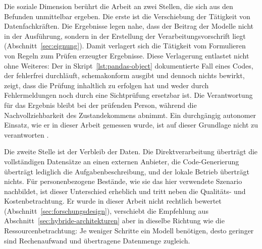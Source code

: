 Die soziale Dimension berührt die Arbeit an zwei Stellen, die sich aus den Befunden unmittelbar ergeben. Die erste ist die Verschiebung der Tätigkeit von Datenfachkräften. Die Ergebnisse legen nahe, dass der Beitrag der Modelle nicht in der Ausführung, sondern in der Erstellung der Verarbeitungsvorschrift liegt (Abschnitt~\ref{sec:eignung}). Damit verlagert sich die Tätigkeit vom Formulieren von Regeln zum Prüfen erzeugter Ergebnisse. Diese Verlagerung entlastet nicht ohne Weiteres: Der in Skript~\ref{lst:pandas-object} dokumentierte Fall eines Codes, der fehlerfrei durchläuft, schemakonform ausgibt und dennoch nichts bewirkt, zeigt, dass die Prüfung inhaltlich zu erfolgen hat und weder durch Fehlermeldungen noch durch eine Sichtprüfung ersetzbar ist. Die Verantwortung für das Ergebnis bleibt bei der prüfenden Person, während die Nachvollziehbarkeit des Zustandekommens abnimmt. Ein durchgängig autonomer Einsatz, wie er in dieser Arbeit gemessen wurde, ist auf dieser Grundlage nicht zu verantworten \autocite{hassaniRoleChatGPTData2023,mumuniAutomatedDataProcessing2025}.

Die zweite Stelle ist der Verbleib der Daten. Die Direktverarbeitung überträgt die vollständigen Datensätze an einen externen Anbieter, die Code-Generierung überträgt lediglich die Aufgabenbeschreibung, und der lokale Betrieb überträgt nichts. Für personenbezogene Bestände, wie sie das hier verwendete Szenario nachbildet, ist dieser Unterschied erheblich und tritt neben die Qualitäts- und Kostenbetrachtung. Er wurde in dieser Arbeit nicht rechtlich bewertet (Abschnitt~\ref{sec:forschungsdesign}), verschiebt die Empfehlung aus Abschnitt~\ref{sec:hybride-architekturen} aber in dieselbe Richtung wie die Ressourcenbetrachtung: Je weniger Schritte ein Modell benötigen, desto geringer sind Rechenaufwand und übertragene Datenmenge zugleich.

